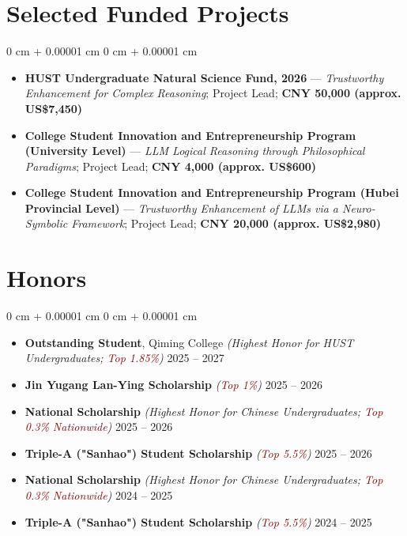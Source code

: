 \documentclass[10pt, letterpaper]{article}
\newcommand{\honornote}[1]{{\small\fontfamily{ptm}\selectfont\itshape (#1)}}
\newcommand{\honornote}[1]{{\small\honornotefont\itshape (#1)}}
\newcommand{\distinction}[1]{\textcolor{darkRed}{#1}}
\newenvironment{highlights}{
    \begin{itemize}[
    topsep=0.05 cm,
    parsep=0.05 cm,
    partopsep=0pt,
    itemsep=0pt,
    leftmargin=0 cm + 10pt
    ]
}{
\end{itemize}
} %
\newenvironment{onecolentry}{
    \begin{adjustwidth}{
        0 cm + 0.00001 cm
    }{
        0 cm + 0.00001 cm
    }
}{
\end{adjustwidth}
} %
\begin{document}
\section{Selected Funded Projects}

\begin{onecolentry}
\begin{highlights}
\item \textbf{HUST Undergraduate Natural Science Fund, 2026} --- \textit{Trustworthy Enhancement for Complex Reasoning}; Project Lead; \textbf{CNY 50,000 (approx. US\$7,450)}
\item \textbf{College Student Innovation and Entrepreneurship Program (University Level)} --- \textit{LLM Logical Reasoning through Philosophical Paradigms}; Project Lead; \textbf{CNY 4,000 (approx. US\$600)}
\item \textbf{College Student Innovation and Entrepreneurship Program (Hubei Provincial Level)} --- \textit{Trustworthy Enhancement of LLMs via a Neuro-Symbolic Framework}; Project Lead; \textbf{CNY 20,000 (approx. US\$2,980)}
\end{highlights}
\end{onecolentry}

\newpage
\section{Honors}

\begin{onecolentry}
\begin{highlights}
\item \textbf{Outstanding Student}, Qiming College \honornote{Highest Honor for HUST Undergraduates; \distinction{Top 1.85\%}} \hfill 2025 -- 2027
\item \textbf{Jin Yugang Lan-Ying Scholarship} \honornote{\distinction{Top 1\%}} \hfill 2025 -- 2026
\item \textbf{National Scholarship} \honornote{Highest Honor for Chinese Undergraduates; \distinction{Top 0.3\% Nationwide}} \hfill 2025 -- 2026
\item \textbf{Triple-A ("Sanhao") Student Scholarship} \honornote{\distinction{Top 5.5\%}} \hfill 2025 -- 2026
\item \textbf{National Scholarship} \honornote{Highest Honor for Chinese Undergraduates; \distinction{Top 0.3\% Nationwide}} \hfill 2024 -- 2025
\item \textbf{Triple-A ("Sanhao") Student Scholarship} \honornote{\distinction{Top 5.5\%}} \hfill 2024 -- 2025
\end{highlights}
\end{onecolentry}
\end{document}
